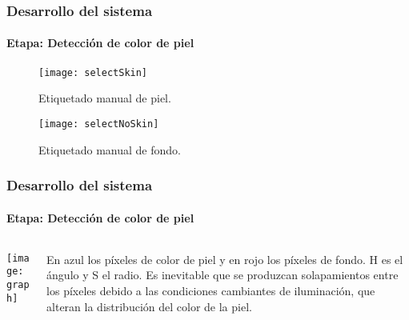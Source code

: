 \documentclass[xcolor=dvipsnames]{beamer}
\begin{document}
	\begin{frame}
		\transdissolve
		\frametitle{Desarrollo del sistema}
		\framesubtitle{Etapa: Detección de color de piel}
		\begin{center}
			\begin{minipage}[c]{.45\textwidth}
				\begin{figure}[h]
					\texttt{[image: selectSkin]}
					\caption{Etiquetado manual de piel.}
				\end{figure}
			\end{minipage}
			\begin{minipage}[c]{.45\textwidth}
				\begin{figure}[h]
					\texttt{[image: selectNoSkin]}
					\caption{Etiquetado manual de fondo.}
				\end{figure}
			\end{minipage}
		\end{center}
	\end{frame}

	\begin{frame}
		\transdissolve
		\frametitle{Desarrollo del sistema}
		\framesubtitle{Etapa: Detección de color de piel}
		\begin{columns}
			\begin{column}{6cm}
				\texttt{[image: graph]}
			\end{column}
			\begin{column}{4cm}
			{\small{En azul los píxeles de color de piel y en rojo los píxeles de fondo. H es el ángulo y S el radio. Es inevitable que se produzcan solapamientos entre los píxeles debido a las condiciones cambiantes de iluminación, que alteran la distribución del color de la piel.}}
			\end{column}
		\end{columns}
	\end{frame}
\end{document}
